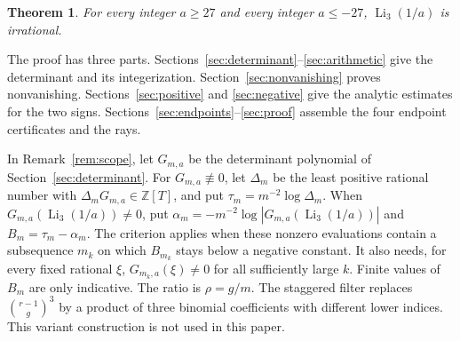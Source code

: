 \documentclass{amsart}
\newtheorem{theorem}{Theorem}
\theoremstyle{remark}
\numberwithin{equation}{section}
\numberwithin{table}{section}
\begin{document}
\begin{theorem}\label{thm:main}
For every integer $a\ge27$ and every integer $a\le-27$,
$\operatorname{Li}_3(1/a)$ is irrational.
\end{theorem}

The proof has three parts. Sections~\ref{sec:determinant}--\ref{sec:arithmetic}
give the determinant and its integerization. Section~\ref{sec:nonvanishing}
proves nonvanishing. Sections~\ref{sec:positive} and \ref{sec:negative}
give the analytic estimates for the two signs.
Sections~\ref{sec:endpoints}--\ref{sec:proof} assemble the four endpoint
certificates and the rays.

In Remark~\ref{rem:scope}, let $G_{m,a}$ be the determinant polynomial of
Section~\ref{sec:determinant}. For $G_{m,a}\not\equiv0$, let $\Delta_m$ be
the least positive rational number with $\Delta_mG_{m,a}\in\mathbb Z[T]$,
and put $\tau_m=m^{-2}\log\Delta_m$. When
$G_{m,a}(\operatorname{Li}_3(1/a))\ne0$, put
$\alpha_m=-m^{-2}\log|G_{m,a}(\operatorname{Li}_3(1/a))|$ and
$B_m=\tau_m-\alpha_m$. The criterion applies when these nonzero evaluations
contain a subsequence $m_k$ on which $B_{m_k}$ stays below a negative
constant. It also needs, for every fixed rational $\xi$,
$G_{m_k,a}(\xi)\ne0$ for all sufficiently large $k$. Finite values of
$B_m$ are only indicative. The ratio is $\rho=g/m$. The
staggered filter replaces $\binom{r-1}{g}^3$ by a product of three binomial
coefficients with different lower indices. This variant construction is not
used in this paper.
\end{document}
